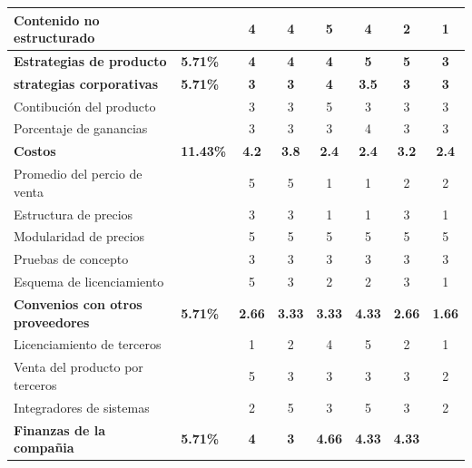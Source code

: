 \documentclass[a4paper,openright,12pt]{book}
\begin{document}
\begin{table}[htbp]
\begin{center}
{\begin{tabular}{|p{5.5cm}|>{\centering\arraybackslash}m{1.7cm}|c|c|c|c|c|c|}
        \hline
        Contenido no estructurado & & 4 & 4 & 5 & 4 & 2 & 1 \\
        \hline
        \rowcolor[gray]{0.9}\textbf{Estrategias de producto}
        & \textbf{5.71\%}
        & \textbf{4}
        & \textbf{4}
        & \textbf{4}
        & \textbf{5}
        & \textbf{5}
        & \textbf{3}\\
        \hline
        \rowcolor[gray]{0.9}\textbf{strategias corporativas}
        & \textbf{5.71\%}
        & \textbf{3}
        &\textbf{ 3}
        & \textbf{4}
        & \textbf{3.5}
        & \textbf{3}
        & \textbf{3}\\
        \hline
        Contibución del producto & & 3 & 3 & 5 & 3 & 3 & 3 \\
        \hline
        Porcentaje de ganancias & & 3 & 3 & 3 & 4 & 3 & 3 \\
        \hline
        \rowcolor[gray]{0.9}\textbf{Costos}
        & \textbf{11.43\%}
        & \textbf{4.2}
        & \textbf{3.8}
        & \textbf{2.4}
        & \textbf{2.4}
        & \textbf{3.2}
        & \textbf{2.4}\\
        \hline
        Promedio del percio de venta & & 5 & 5 & 1 & 1 & 2 & 2 \\
        \hline
        Estructura de precios & & 3 & 3 & 1 & 1 & 3 & 1 \\
        \hline
        Modularidad de precios & & 5 & 5 & 5 & 5 & 5 & 5 \\
        \hline
        Pruebas de concepto & & 3 & 3 & 3 & 3 & 3 & 3 \\
        \hline
        Esquema de licenciamiento & & 5 & 3 & 2 & 2 & 3 & 1 \\
        \hline
        \rowcolor[gray]{0.9}\textbf{Convenios con otros proveedores}
        & \textbf{5.71\%}
        & \textbf{2.66}
        & \textbf{3.33}
        & \textbf{3.33}
        & \textbf{4.33}
        & \textbf{2.66}
        & \textbf{1.66}\\
        \hline
        Licenciamiento de terceros & & 1 & 2 & 4 & 5 & 2 & 1 \\
        \hline
        Venta del producto por terceros & & 5 & 3 & 3 & 3 & 3 & 2 \\
        \hline
        Integradores de sistemas & & 2 & 5 & 3 & 5 & 3 & 2 \\
        \hline
        \rowcolor[gray]{0.9}\textbf{Finanzas de la compañia}
        & \textbf{5.71\%}
        & \textbf{4}
        & \textbf{3}
        & \textbf{4.66}
        & \textbf{4.33}
        & \textbf{4.33}

\end{tabular}}
\end{center}
\end{table}
\end{document}
